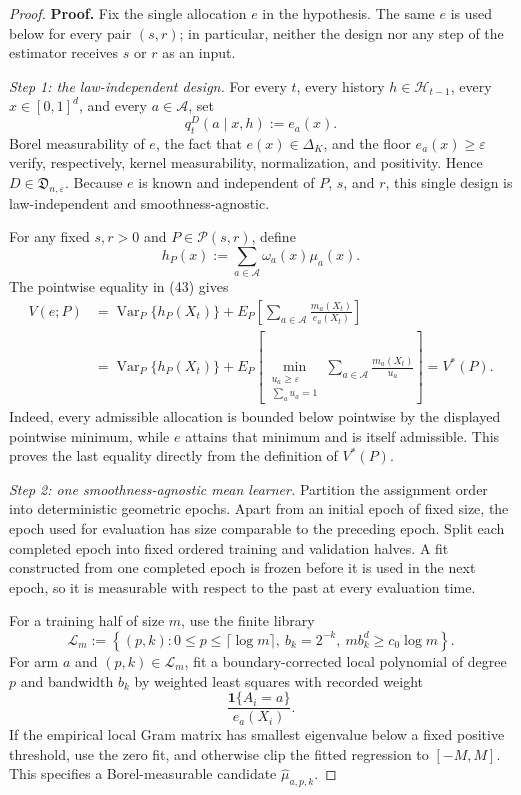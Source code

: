 \documentclass{article}
\begin{document}
\begin{proof}
\textbf{Proof.}
Fix the single allocation \(e\) in the hypothesis.  The same \(e\) is used below for every pair \((s,r)\); in particular, neither the design nor any step of the estimator receives \(s\) or \(r\) as an input.

\emph{Step 1: the law-independent design.}
For every \(t\), every history \(h\in\mathcal H_{t-1}\), every \(x\in[0,1]^d\), and every \(a\in\mathcal A\), set
\[
q_t^D(a\mid x,h):=e_a(x).
\tag{45}
\]
Borel measurability of \(e\), the fact that \(e(x)\in\Delta_K\), and the floor \(e_a(x)\geq\varepsilon\) verify, respectively, kernel measurability, normalization, and positivity.  Hence \(D\in\mathfrak D_{n,\varepsilon}\).  Because \(e\) is known and independent of \(P\), \(s\), and \(r\), this single design is law-independent and smoothness-agnostic.

For any fixed \(s,r>0\) and \(P\in\mathcal P(s,r)\), define
\[
h_P(x):=\sum_{a\in\mathcal A}\omega_a(x)\mu_a(x).
\]
The pointwise equality in (43) gives
\[
\begin{aligned}
V(e;P)
&=\operatorname{Var}_P\{h_P(X_t)\}
  +E_P\!\left[\sum_{a\in\mathcal A}\frac{m_a(X_t)}{e_a(X_t)}\right]\\
&=\operatorname{Var}_P\{h_P(X_t)\}
  +E_P\!\left[
    \min_{\substack{u_a\geq\varepsilon\\\sum_a u_a=1}}
    \sum_{a\in\mathcal A}\frac{m_a(X_t)}{u_a}
  \right]
=V^*(P).
\tag{46}
\end{aligned}
\]
Indeed, every admissible allocation is bounded below pointwise by the displayed pointwise minimum, while \(e\) attains that minimum and is itself admissible.  This proves the last equality directly from the definition of \(V^*(P)\).

\emph{Step 2: one smoothness-agnostic mean learner.}
Partition the assignment order into deterministic geometric epochs.  Apart from an initial epoch of fixed size, the epoch used for evaluation has size comparable to the preceding epoch.  Split each completed epoch into fixed ordered training and validation halves.  A fit constructed from one completed epoch is frozen before it is used in the next epoch, so it is measurable with respect to the past at every evaluation time.

For a training half of size \(m\), use the finite library
\[
\mathcal L_m
:=\left\{(p,k):0\leq p\leq\lceil\log m\rceil,
\ b_k=2^{-k},\ mb_k^d\geq c_0\log m\right\}.
\tag{47}
\]
For arm \(a\) and \((p,k)\in\mathcal L_m\), fit a boundary-corrected local polynomial of degree \(p\) and bandwidth \(b_k\) by weighted least squares with recorded weight
\[
\frac{\mathbf 1\{A_i=a\}}{e_a(X_i)}.
\]
If the empirical local Gram matrix has smallest eigenvalue below a fixed positive threshold, use the zero fit, and otherwise clip the fitted regression to \([-M,M]\).  This specifies a Borel-measurable candidate \(\widehat\mu_{a,p,k}\).


\end{proof}
\end{document}
